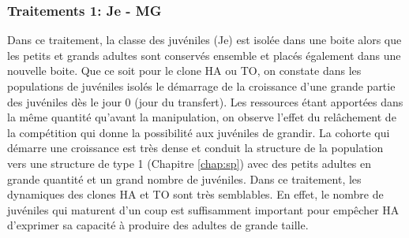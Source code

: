 \subsubsection{Traitements 1: Je - MG}

Dans ce traitement, la classe des juvéniles (Je) est isolée dans une boite alors
que les petits et grands adultes sont conservés ensemble et placés également
dans une nouvelle boite. Que ce soit pour le clone HA ou TO, on constate dans
les populations de juvéniles isolés le démarrage de la croissance d'une grande
partie des juvéniles dès le jour 0 (jour du transfert). Les ressources étant
apportées dans la même quantité qu'avant la manipulation, on observe l'effet du
relâchement de la compétition qui donne la possibilité aux juvéniles de grandir.
La cohorte qui démarre une croissance est très dense et conduit la structure de
la population vers une structure de type 1 (Chapitre \ref{chap:sp}) avec des
petits adultes en grande quantité et un grand nombre de juvéniles. Dans ce
traitement, les dynamiques des clones HA et TO sont très semblables. En effet,
le nombre de juvéniles qui maturent d'un coup est suffisamment important pour
empêcher HA d'exprimer sa capacité à produire des adultes de grande taille.


